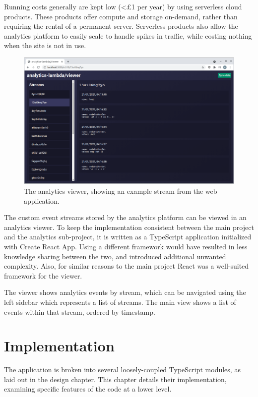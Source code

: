\documentclass[a4paper,fleqn,oneside,12pt]{report}
\begin{document}
Running costs generally are kept low (<£1 per year) by using serverless cloud products. These products offer compute and storage on-demand, rather than requiring the rental of a permanent server. Serverless products also allow the analytics platform to easily scale to handle spikes in traffic, while costing nothing when the site is not in use.

\begin{figure}[h!]
  \centering
  \includegraphics[width=1.000\linewidth]{images/image16.png}
  \caption{The analytics viewer, showing an example stream from the web application.}
\end{figure}

The custom event streams stored by the analytics platform can be viewed in an analytics viewer. To keep the implementation consistent between the main project and the analytics sub-project, it is written as a TypeScript application initialized with Create React App. Using a different framework would have resulted in less knowledge sharing between the two, and introduced additional unwanted complexity. Also, for similar reasons to the main project React was a well-suited framework for the viewer.

The viewer shows analytics events by stream, which can be navigated using the left sidebar which represents a list of streams. The main view shows a list of events within that stream, ordered by timestamp.

\chapter{Implementation}\label{id:h.igepudpadp49}

The application is broken into several loosely-coupled TypeScript modules, as laid out in the design chapter. This chapter details their implementation, examining specific features of the code at a lower level.
\end{document}

